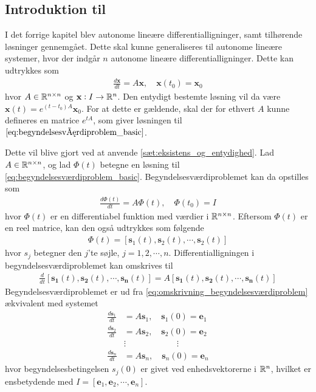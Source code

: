 \subsection[Introduktion til \texorpdfstring{$e^{tA}$}{exp(tA)}]{Introduktion til }

I det forrige kapitel blev autonome lineære differentialligninger, samt tilhørende løsninger gennemgået. Dette skal kunne generaliseres til autonome lineære systemer, hvor der indgår $n$ autonome lineære differentialligninger. Dette kan udtrykkes som
%
\begin{align} \label{eq:begyndelsesværdiproblem_basic}
    \frac{d\textbf{x}}{dt}=A\textbf{x}, \quad \textbf{x}(t_0)=\textbf{x}_0
\end{align}
%
hvor $A \in \mathbb{R}^{n \times n}$ og $\textbf{x}: I \to \mathbb{R}^n$. Den entydigt bestemte løsning vil da være $\textbf{x}(t)=e^{(t-t_0)A}\textbf{x}_0$. For at dette er gældende, skal der for ethvert $A$ kunne defineres en matrice $e^{tA}$, som giver løsningen til $\eqref{eq:begyndelsesværdiproblem_basic}$.

Dette vil blive gjort ved at anvende \autoref{sæt:eksistens_og_entydighed}. Lad $A \in \mathbb{R}^{n \times n}$, og lad $\Phi(t)$ betegne en løsning til \eqref{eq:begyndelsesværdiproblem_basic}. Begyndelsesværdiproblemet kan da opstilles som
%
\begin{align}
  \frac{d\Phi(t)}{dt}=A\Phi(t), \quad \Phi(t_0)=I 
\end{align}
%
hvor $\Phi(t)$ er en differentiabel funktion med værdier i $\mathbb{R}^{n \times n}$. Eftersom $\Phi(t)$ er en reel matrice, kan den også udtrykkes som følgende
\begin{align*}
    \Phi(t)=[\mathbf{s}_1(t), \mathbf{s}_2(t), \cdots, \mathbf{s}_2(t)]
\end{align*}
%
hvor $s_j$ betegner den $j$'te søjle, $j=1, 2, \cdots, n$. Differentialligningen i begyndelsesværdiproblemet kan omskrives til
\begin{align}
    \frac{d}{dt}[\mathbf{s_1}(t), \mathbf{s_2}(t), \cdots, \mathbf{s_n}(t)]=A[\mathbf{s_1}(t), \mathbf{s_2}(t), \cdots, \mathbf{s_n}(t)] \label{eq:omskrivning_begyndelsesværdiproblem}
\end{align}
%
Begyndelsesværdiproblemet er ud fra \eqref{eq:omskrivning_begyndelsesværdiproblem} ækvivalent med systemet
\begin{align*}
    \frac{d \mathbf{s}_1}{dt}&=A\mathbf{s}_1, \quad \mathbf{s}_1(0)=\mathbf{e}_1\\
    \frac{d \mathbf{s}_2}{dt}&=A\mathbf{s}_2, \quad \mathbf{s}_2(0)=\mathbf{e}_2\\
    &\vdots \quad\quad\quad\quad\quad\quad \vdots\\
    \frac{d \mathbf{s}_n}{dt}&=A\mathbf{s}_n, \quad \mathbf{s}_n(0)=\mathbf{e}_n
\end{align*}
%
hvor begyndelsesbetingelsen $s_j(0)$ er givet ved enhedsvektorerne i $\mathbb{R}^n$, hvilket er ensbetydende med $I=[\textbf{e}_1, \textbf{e}_2, \cdots, \textbf{e}_n]$.

